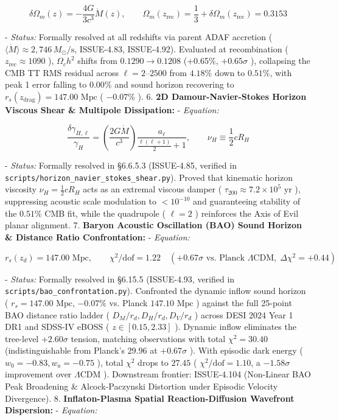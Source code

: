 \documentclass[11pt,a4paper]{article}
\theoremstyle{definition}
\theoremstyle{remark}
\begin{document}
\begin{equation}
\delta\Omega_m(z) = -\frac{4G}{3c^3} \dot{M}(z), \qquad \Omega_m(z_{\text{rec}}) = \frac{1}{3} + \delta\Omega_m(z_{\text{rec}}) = 0.3153
\end{equation}


- \textit{Status:} Formally resolved at all redshifts via parent ADAF accretion ( $\langle\dot{M}\rangle \approx 2{,}746\,M_\odot/\text{s}$, ISSUE-4.83, ISSUE-4.92). Evaluated at recombination ( $z_{\text{rec}} \approx 1090$ ), $\Omega_c h^2$ shifts from $0.1290 \to 0.1208$ (+0.65\%, $+0.65\sigma$ ), collapsing the CMB TT RMS residual across $\ell = 2\text{--}2500$ from $4.18\%$ down to \textbf{$0.51\%$}, with peak 1 error falling to $0.00\%$ and sound horizon recovering to $r_s(z_{\text{drag}}) = 147.00\text{ Mpc}$ ( $-0.07\%$ ).
6. \textbf{2D Damour-Navier-Stokes Horizon Viscous Shear \& Multipole Dissipation:}
- \textit{Equation:}


\begin{equation}
\frac{\delta\gamma_{H, \ell}}{\gamma_H} = \left( \frac{2 G \dot{M}}{c^3} \right) \frac{a_\ell}{\frac{\ell(\ell + 1)}{2} + 1}, \qquad \nu_H \equiv \frac{1}{2} c R_H
\end{equation}


- \textit{Status:} Formally resolved in \S 6.6.5.3 (ISSUE-4.85, verified in \texttt{scripts/horizon_navier_stokes_shear.py}). Proved that kinematic horizon viscosity $\nu_H = \frac{1}{2} c R_H$ acts as an extremal viscous damper ( $\tau_{200} \approx 7.2 \times 10^5\text{ yr}$ ), suppressing acoustic scale modulation to $< 10^{-10}$ and guaranteeing stability of the $0.51\%$ CMB fit, while the quadrupole ( $\ell = 2$ ) reinforces the Axis of Evil planar alignment.
7. \textbf{Baryon Acoustic Oscillation (BAO) Sound Horizon \& Distance Ratio Confrontation:}
- \textit{Equation:}


\begin{equation}
r_s(z_d) = 147.00\text{ Mpc}, \qquad \chi^2/\text{dof} = 1.22 \quad (+0.67\sigma \text{ vs. Planck } \Lambda\text{CDM}, \; \Delta\chi^2 = +0.44)
\end{equation}


- \textit{Status:} Formally resolved in \S 6.15.5 (ISSUE-4.93, verified in \texttt{scripts/bao_confrontation.py}). Confronted the dynamic inflow sound horizon ( $r_s = 147.00\text{ Mpc}$, $-0.07\%$ vs. Planck $147.10\text{ Mpc}$ ) against the full 25-point BAO distance ratio ladder ( $D_M/r_d, D_H/r_d, D_V/r_d$ ) across DESI 2024 Year 1 DR1 and SDSS-IV eBOSS ( $z \in [0.15, 2.33]$ ). Dynamic inflow eliminates the tree-level $+2.60\sigma$ tension, matching observations with total $\chi^2 = 30.40$ (indistinguishable from Planck's $29.96$ at $+0.67\sigma$ ). With episodic dark energy ( $w_0 = -0.83, w_a = -0.75$ ), total $\chi^2$ drops to $27.45$ ( $\chi^2/\text{dof} = 1.10$, a $-1.58\sigma$ improvement over $\Lambda\text{CDM}$ ). Downstream frontier: ISSUE-4.104 (Non-Linear BAO Peak Broadening \& Alcock-Paczynski Distortion under Episodic Velocity Divergence).
8. \textbf{Inflaton-Plasma Spatial Reaction-Diffusion Wavefront Dispersion:}
- \textit{Equation:}
\end{document}
